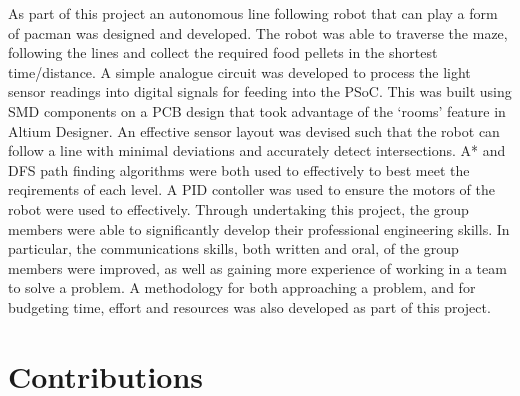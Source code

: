 \documentclass{article}
\begin{document}
As part of this project an autonomous line following robot that can play a form of pacman was designed and developed. The robot was able to traverse the maze, following the lines and collect the required food pellets in the shortest time/distance. A simple analogue circuit was developed to process the light sensor readings into digital signals for feeding into the PSoC. This was built using SMD components on a PCB design that took advantage of the `rooms' feature in Altium Designer. An effective sensor layout was devised such that the robot can follow a line with minimal deviations and accurately detect intersections. A* and DFS path finding algorithms were both used to effectively to best meet the reqirements of each level. A PID contoller was used to ensure the motors of the robot were used to effectively. Through undertaking this project, the group members were able to significantly develop their professional engineering skills. In particular, the communications skills, both written and oral, of the group members were improved, as well as gaining more experience of working in a team to solve a problem. A methodology for both approaching a problem, and for budgeting time, effort and resources was also developed as part of this project.

\clearpage

\section{Contributions}
\end{document}

